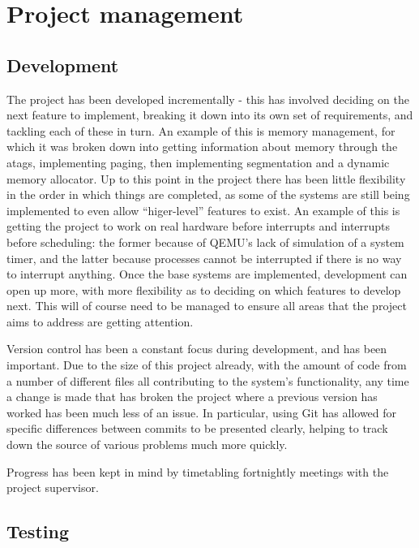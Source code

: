 \documentclass[10pt,a4paper]{article}
\begin{document}

\section{Project management}
\subsection{Development}
The project has been developed incrementally - this has involved deciding on the
next feature to implement, breaking it down into its own set of requirements,
and tackling each of these in turn. An example of this is memory management, for
which it was broken down into getting information about memory through the
atags, implementing paging, then implementing segmentation and a dynamic memory
allocator. Up to this point in the project there has been little flexibility
in the order in which things are completed, as some of the systems are still
being implemented to even allow ``higer-level'' features to exist. An example of
this is getting the project to work on real hardware before interrupts and
interrupts before scheduling: the former because of QEMU's lack of simulation of a
system timer, and the latter because processes cannot be interrupted if there is
no way to interrupt anything. Once the base systems are implemented, development
can open up more, with more flexibility as to deciding on which features to
develop next. This will of course need to be managed to ensure all areas that
the project aims to address are getting attention.

Version control has been a constant focus during development, and has been
important. Due to the size of this project already, with the amount of code from
a number of different files all contributing to the system's functionality, any
time a change is made that has broken the project where a previous version has
worked has been much less of an issue. In particular, using Git has allowed for
specific differences between commits to be presented clearly, helping to track
down the source of various problems much more quickly.

Progress has been kept in mind by timetabling fortnightly meetings with the
project supervisor.

\subsection{Testing}
\end{document}
